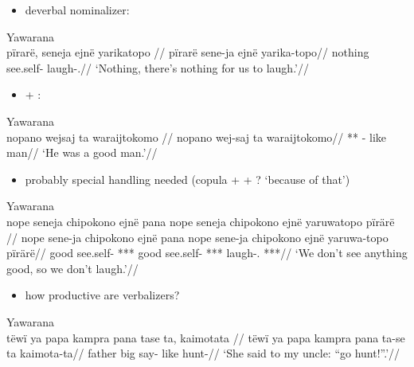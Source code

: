 \documentclass{memoir}
\begin{document}
\begin{itemize}
\tightlist
\item
  deverbal nominalizer:
\end{itemize}

\ex Yawarana \\
\label{convrisamaj-13}    \begingl
    \glpreamble  pïrarë, seneja ejnë yarikatopo //
    \gla pïrarë sene-ja ejnë yarika-topo//
    \glb nothing see.self-  laugh-.//
        \glft ‘Nothing, there’s nothing for us to laugh.’//  
    \endgl 
\xe

\begin{itemize}
\tightlist
\item
   + :
\end{itemize}

\ex Yawarana \\
\label{anfoperso-45}    \begingl
    \glpreamble  nopano wejsaj ta waraijtokomo //
    \gla nopano wej-saj ta waraijtokomo//
    \glb *** - like man//
        \glft ‘He was a good man.’//  
    \endgl 
\xe

\begin{itemize}
\tightlist
\item
  probably special handling needed (copula +  + ? `because of
  that')
\end{itemize}

\ex Yawarana \\
\label{convrisamaj-29}    \begingl
    \glpreamble  nope seneja chipokono ejnë pana nope seneja chipokono ejnë yaruwatopo pïrärë //
    \gla nope sene-ja chipokono ejnë pana nope sene-ja chipokono ejnë yaruwa-topo pïrärë//
    \glb good see.self- ***   good see.self- ***  laugh-. ***//
        \glft ‘We don’t see anything good, so we don’t laugh.’//  
    \endgl 
\xe

\begin{itemize}
\tightlist
\item
  how productive are verbalizers?
\end{itemize}

\ex Yawarana \\
\label{anfoperso-22}    \begingl
    \glpreamble  tëwï ya papa kampra pana tase ta, kaimotata //
    \gla tëwï ya papa kampra pana ta-se ta kaimota-ta//
    \glb {}  father big  say- like hunt-//
        \glft ‘She said to my uncle: “go hunt!”.’//  
    \endgl 
\xe
\end{document}

